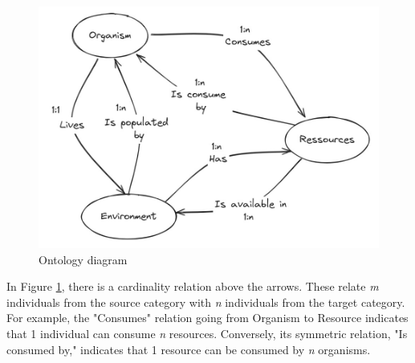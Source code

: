 \begin{figure}[H]
    \centering
    \includegraphics[width=0.7\linewidth]{diagram}
    \caption{Ontology diagram}
    \label{fig:diagram}
\end{figure}

In Figure \ref{fig:diagram}, there is a cardinality relation above the arrows. These relate \textit{m} individuals from the source category with \textit{n} individuals from the target category. For example, the "Consumes" relation going from Organism to Resource indicates that 1 individual can consume \textit{n} resources. Conversely, its symmetric relation, "Is consumed by," indicates that 1 resource can be consumed by \textit{n} organisms.
